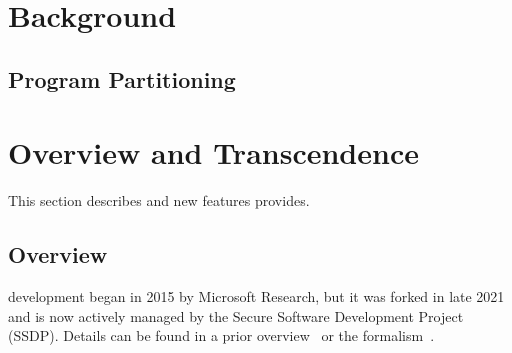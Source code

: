 \section{Background}
\subsection{Program Partitioning}
\label{subsec:background:programpart}

\section{Overview and Transcendence}\label{sec:overview}
This section describes \checkedc{} and new features \systemname{} provides.

\subsection{\checkedc Overview}
% 
\checkedc{} development began in 2015 by Microsoft Research, but it was forked
in late 2021 and is now actively managed by the Secure Software
Development Project (SSDP). Details can be found in a prior
overview~\cite{Elliott2018} or the formalism~\cite{li22checkedc}.
%

